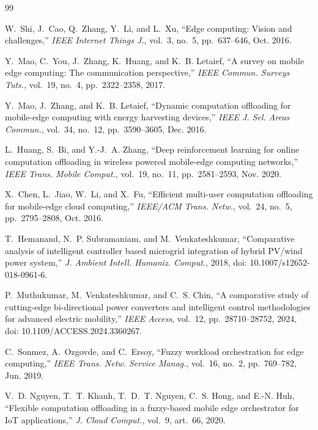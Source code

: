 \documentclass[conference]{IEEEtran}
\begin{document}
\begin{thebibliography}{99}

W.~Shi, J.~Cao, Q.~Zhang, Y.~Li, and L.~Xu, ``Edge computing: Vision and challenges,''
\emph{IEEE Internet Things J.}, vol.~3, no.~5, pp.~637--646, Oct. 2016.

Y.~Mao, C.~You, J.~Zhang, K.~Huang, and K.~B. Letaief, ``A survey on mobile edge computing: The communication perspective,''
\emph{IEEE Commun. Surveys Tuts.}, vol.~19, no.~4, pp.~2322--2358, 2017.

Y.~Mao, J.~Zhang, and K.~B. Letaief, ``Dynamic computation offloading for mobile-edge computing with energy harvesting devices,''
\emph{IEEE J. Sel. Areas Commun.}, vol.~34, no.~12, pp.~3590--3605, Dec. 2016.

L.~Huang, S.~Bi, and Y.-J.~A. Zhang, ``Deep reinforcement learning for online computation offloading in wireless powered
mobile-edge computing networks,'' \emph{IEEE Trans. Mobile Comput.}, vol.~19, no.~11, pp.~2581--2593, Nov. 2020.

X.~Chen, L.~Jiao, W.~Li, and X.~Fu, ``Efficient multi-user computation offloading for mobile-edge cloud computing,''
\emph{IEEE/ACM Trans. Netw.}, vol.~24, no.~5, pp.~2795--2808, Oct. 2016.

T.~Hemanand, N.~P. Subramaniam, and M.~Venkateshkumar, ``Comparative analysis of intelligent controller based microgrid integration
of hybrid PV/wind power system,'' \emph{J. Ambient Intell. Humaniz. Comput.}, 2018, doi: 10.1007/s12652-018-0961-6.

P.~Muthukumar, M.~Venkateshkumar, and C.~S. Chin, ``A comparative study of cutting-edge bi-directional power converters and
intelligent control methodologies for advanced electric mobility,'' \emph{IEEE Access}, vol.~12, pp.~28710--28752, 2024,
doi: 10.1109/ACCESS.2024.3360267.

C.~Sonmez, A.~Ozgovde, and C.~Ersoy, ``Fuzzy workload orchestration for edge computing,''
\emph{IEEE Trans. Netw. Service Manag.}, vol.~16, no.~2, pp.~769--782, Jun. 2019.

V.~D. Nguyen, T.~T. Khanh, T.~D.~T. Nguyen, C.~S. Hong, and E.-N. Huh, ``Flexible computation offloading in a fuzzy-based mobile edge
orchestrator for IoT applications,'' \emph{J. Cloud Comput.}, vol.~9, art.~66, 2020.


\end{thebibliography}
\end{document}
